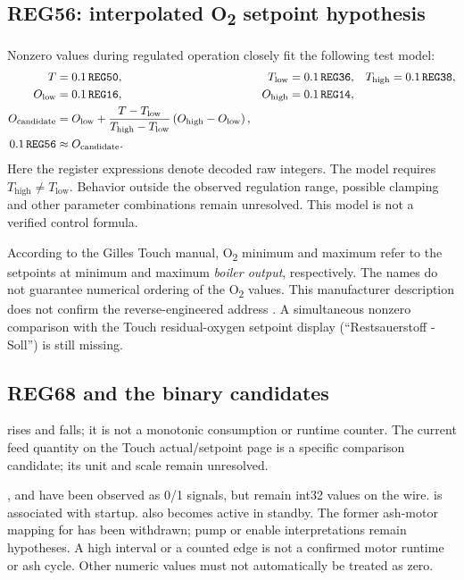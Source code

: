 \documentclass[10pt,a4paper]{article}
\begin{document}
\subsection{REG56: interpolated O\texorpdfstring{\textsubscript{2}}{2} setpoint hypothesis}
Nonzero values during regulated operation closely fit the following test model:
\begin{align*}
T&=0.1\,\texttt{REG50},&T_{\mathrm{low}}&=0.1\,\texttt{REG36},&T_{\mathrm{high}}&=0.1\,\texttt{REG38},\\
O_{\mathrm{low}}&=0.1\,\texttt{REG16},&O_{\mathrm{high}}&=0.1\,\texttt{REG14},\\
O_{\mathrm{candidate}}&=O_{\mathrm{low}}+
\frac{T-T_{\mathrm{low}}}{T_{\mathrm{high}}-T_{\mathrm{low}}}
\left(O_{\mathrm{high}}-O_{\mathrm{low}}\right),\\
0.1\,\texttt{REG56}&\approx O_{\mathrm{candidate}}.
\end{align*}
Here the register expressions denote decoded raw integers. The model requires $T_{\mathrm{high}}\ne T_{\mathrm{low}}$. Behavior outside the observed regulation range, possible clamping and other parameter combinations remain unresolved. This model is not a verified control formula.

According to the Gilles Touch manual, O\textsubscript{2} minimum and maximum refer to the setpoints at minimum and maximum \emph{boiler output}, respectively. The names do not guarantee numerical ordering of the O\textsubscript{2} values. This manufacturer description does not confirm the reverse-engineered address . A simultaneous nonzero comparison with the Touch residual-oxygen setpoint display (``Restsauerstoff - Soll'') is still missing.

\subsection{REG68 and the binary candidates}
 rises and falls; it is not a monotonic consumption or runtime counter. The current feed quantity on the Touch actual/setpoint page is a specific comparison candidate; its unit and scale remain unresolved.

,  and  have been observed as 0/1 signals, but remain int32 values on the wire.  is associated with startup.  also becomes active in standby. The former ash-motor mapping for  has been withdrawn; pump or enable interpretations remain hypotheses. A high interval or a counted edge is not a confirmed motor runtime or ash cycle. Other numeric values must not automatically be treated as zero.
\end{document}
